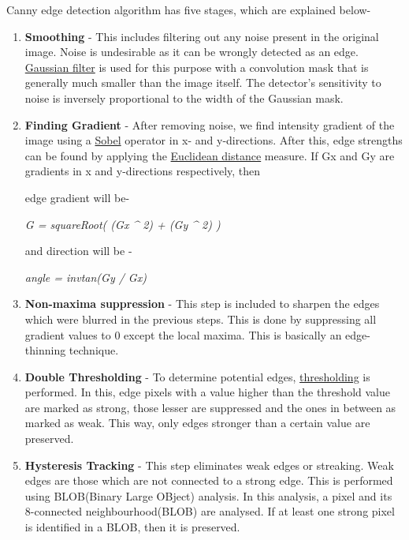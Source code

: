\documentclass[]{article}
\begin{document}
Canny edge detection algorithm has five stages, which are explained
below-

\begin{enumerate}
\def\labelenumi{\arabic{enumi}.}
\item
  \textbf{Smoothing} - This includes filtering out any noise present in
  the original image. Noise is undesirable as it can be wrongly detected
  as an edge.
  \href{https://github.com/eyantrainternship/eYSIP_2015_Marker_based_Robot_Localisation/wiki/Image-Filtering}{Gaussian
  filter} is used for this purpose with a convolution mask that is
  generally much smaller than the image itself. The detector's
  sensitivity to noise is inversely proportional to the width of the
  Gaussian mask.
\item
  \textbf{Finding Gradient} - After removing noise, we find intensity
  gradient of the image using a
  \href{https://github.com/eyantrainternship/eYSIP_2015_Marker_based_Robot_Localisation/wiki/Line-Detection:-Part-1}{Sobel}
  operator in x- and y-directions. After this, edge strengths can be
  found by applying the
  \href{https://github.com/eyantrainternship/eYSIP_2015_Marker_based_Robot_Localisation/wiki/Distance-Transformation}{Euclidean
  distance} measure. If Gx and Gy are gradients in x and y-directions
  respectively, then

  edge gradient will be-

  \emph{G = squareRoot( (Gx \^{} 2) + (Gy \^{} 2) )}

  and direction will be -

  \emph{angle = invtan(Gy / Gx)}
\item
  \textbf{Non-maxima suppression} - This step is included to sharpen the
  edges which were blurred in the previous steps. This is done by
  suppressing all gradient values to 0 except the local maxima. This is
  basically an edge-thinning technique.
\item
  \textbf{Double Thresholding} - To determine potential edges,
  \href{https://github.com/eyantrainternship/eYSIP_2015_Marker_based_Robot_Localisation/wiki/Thresholding}{thresholding}
  is performed. In this, edge pixels with a value higher than the
  threshold value are marked as strong, those lesser are suppressed and
  the ones in between as marked as weak. This way, only edges stronger
  than a certain value are preserved.
\item
  \textbf{Hysteresis Tracking} - This step eliminates weak edges or
  streaking. Weak edges are those which are not connected to a strong
  edge. This is performed using BLOB(Binary Large OBject) analysis. In
  this analysis, a pixel and its 8-connected neighbourhood(BLOB) are
  analysed. If at least one strong pixel is identified in a BLOB, then
  it is preserved.
\end{enumerate}
\end{document}
